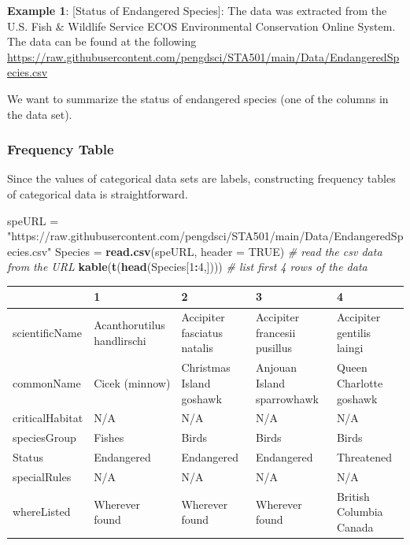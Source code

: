 \documentclass[
]{book}
\newenvironment{Shaded}{\begin{snugshade}}{\end{snugshade}}
\newcommand{\AttributeTok}[1]{\textcolor[rgb]{0.13,0.29,0.53}{#1}}
\newcommand{\CommentTok}[1]{\textcolor[rgb]{0.56,0.35,0.01}{\textit{#1}}}
\newcommand{\ConstantTok}[1]{\textcolor[rgb]{0.56,0.35,0.01}{#1}}
\newcommand{\DecValTok}[1]{\textcolor[rgb]{0.00,0.00,0.81}{#1}}
\newcommand{\FunctionTok}[1]{\textcolor[rgb]{0.13,0.29,0.53}{\textbf{#1}}}
\newcommand{\NormalTok}[1]{#1}
\newcommand{\OtherTok}[1]{\textcolor[rgb]{0.56,0.35,0.01}{#1}}
\newcommand{\SpecialCharTok}[1]{\textcolor[rgb]{0.81,0.36,0.00}{\textbf{#1}}}
\newcommand{\StringTok}[1]{\textcolor[rgb]{0.31,0.60,0.02}{#1}}
\begin{document}
\textbf{Example 1}: {[}Status of Endangered Species{]}: The data was extracted from the U.S. Fish \& Wildlife Service ECOS Environmental Conservation Online System. The data can be found at the following
\url{https://raw.githubusercontent.com/pengdsci/STA501/main/Data/EndangeredSpecies.csv}

We want to summarize the status of endangered species (one of the columns in the data set).

\hypertarget{frequency-table}{%
\subsubsection{Frequency Table}\label{frequency-table}}

Since the values of categorical data sets are labels, constructing frequency tables of categorical data is straightforward.

\begin{Shaded}
\begin{Highlighting}[]
\NormalTok{speURL }\OtherTok{=} \StringTok{"https://raw.githubusercontent.com/pengdsci/STA501/main/Data/EndangeredSpecies.csv"}
\NormalTok{Species }\OtherTok{=} \FunctionTok{read.csv}\NormalTok{(speURL, }\AttributeTok{header =} \ConstantTok{TRUE}\NormalTok{)   }\CommentTok{\# read the csv data from the URL }
\FunctionTok{kable}\NormalTok{(}\FunctionTok{t}\NormalTok{(}\FunctionTok{head}\NormalTok{(Species[}\DecValTok{1}\SpecialCharTok{:}\DecValTok{4}\NormalTok{,])))     }\CommentTok{\# list first 4 rows of the data}
\end{Highlighting}
\end{Shaded}

\begin{tabular}{l|l|l|l|l}
\hline
  & 1 & 2 & 3 & 4\\
\hline
scientificName & Acanthorutilus handlirschi & Accipiter fasciatus natalis & Accipiter francesii pusillus & Accipiter gentilis laingi\\
\hline
commonName & Cicek (minnow) & Christmas Island goshawk & Anjouan Island sparrowhawk & Queen Charlotte goshawk\\
\hline
criticalHabitat & N/A & N/A & N/A & N/A\\
\hline
speciesGroup & Fishes & Birds & Birds & Birds\\
\hline
Status & Endangered & Endangered & Endangered & Threatened\\
\hline
specialRules & N/A & N/A & N/A & N/A\\
\hline
whereListed & Wherever found & Wherever found & Wherever found & British Columbia Canada\\
\hline
\end{tabular}
\end{document}
